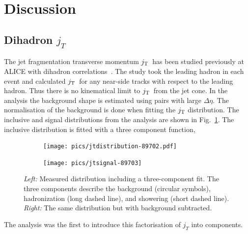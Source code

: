 
\section{Discussion}
\label{sec:disc}
\cite{Chatrchyan:2014gia,Dasgupta:2007wa}

\subsection{Dihadron $j_T$}
The jet fragmentation transverse momentum $\jt{}$ has been studied previously at ALICE with dihadron correlations~\cite{ALICEjt}. The study took the leading hadron in each event and calculated $\jt{}$ for any near-side tracks with respect to the leading hadron. Thus there is no kinematical limit to $\jt{}$ from the jet cone. In the analysis the background shape is estimated using pairs with large $\Delta \eta$. The normalisation of the background is done when fitting the $\jt{}$ distribution. The inclusive and signal distributions from the analysis are shown in Fig.~\ref{fig:dihadron}. The inclusive distribution is fitted with a three component function, 

\begin{figure}[htp]
\centering
\begin{subfigure}{0.49\textwidth}
\texttt{[image: pics/jtdistribution-89702.pdf]}
\end{subfigure}
\begin{subfigure}{0.49\textwidth}
\texttt{[image: pics/jtsignal-89703]}
\end{subfigure}
\caption[Dihadron $\jt{}$ results]{\emph{Left:} Measured \jt distribution including a three-component fit. The three components describe the background (circular symbols), hadronization (long dashed line), and showering (short dashed line). \emph{Right:} The same \jt distribution but with background subtracted.}
\label{fig:dihadron}
\end{figure}



The analysis was the first to introduce this factorisation of $j_T$ into components.

